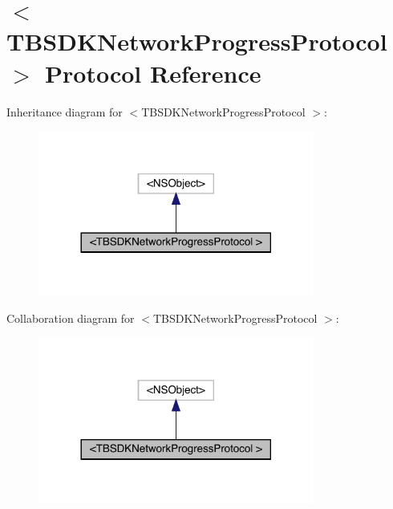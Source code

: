\hypertarget{protocol_t_b_s_d_k_network_progress_protocol_01-p}{}\section{$<$T\+B\+S\+D\+K\+Network\+Progress\+Protocol $>$ Protocol Reference}
\label{protocol_t_b_s_d_k_network_progress_protocol_01-p}


Inheritance diagram for $<$T\+B\+S\+D\+K\+Network\+Progress\+Protocol $>$\+:\nopagebreak
\begin{figure}[H]
\begin{center}
\leavevmode
\includegraphics[width=257pt]{protocol_t_b_s_d_k_network_progress_protocol_01-p__inherit__graph}
\end{center}
\end{figure}


Collaboration diagram for $<$T\+B\+S\+D\+K\+Network\+Progress\+Protocol $>$\+:\nopagebreak
\begin{figure}[H]
\begin{center}
\leavevmode
\includegraphics[width=257pt]{protocol_t_b_s_d_k_network_progress_protocol_01-p__coll__graph}
\end{center}
\end{figure}
